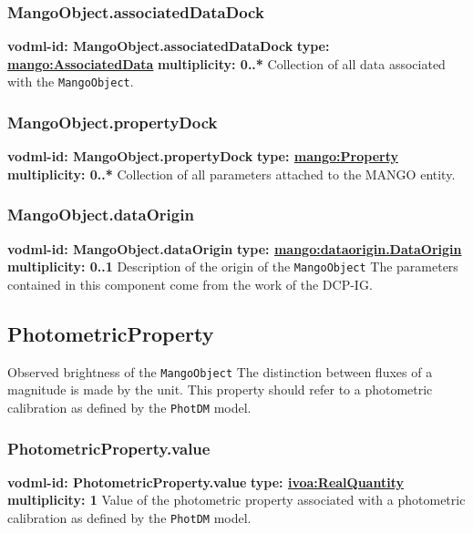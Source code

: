     \subsubsection{MangoObject.associatedDataDock}
      \textbf{vodml-id: MangoObject.associatedDataDock} \newline
      \textbf{type: \hyperref[sect:AssociatedData]{mango:AssociatedData}} \newline
      \textbf{multiplicity: 0..*} \newline 
      Collection of all data associated with the \texttt{MangoObject}.

    \subsubsection{MangoObject.propertyDock}
      \textbf{vodml-id: MangoObject.propertyDock} \newline
      \textbf{type: \hyperref[sect:Property]{mango:Property}} \newline
      \textbf{multiplicity: 0..*} \newline 
      Collection of all parameters attached to the MANGO entity.

    \subsubsection{MangoObject.dataOrigin}
      \textbf{vodml-id: MangoObject.dataOrigin} \newline
      \textbf{type: \hyperref[sect:dataorigin.DataOrigin]{mango:dataorigin.DataOrigin}} \newline
      \textbf{multiplicity: 0..1} \newline 
      Description of the origin of the \texttt{MangoObject} The parameters contained in this component come from the work of the DCP-IG.

  \subsection{PhotometricProperty}
  \label{sect:PhotometricProperty}
    Observed brightness of the \texttt{MangoObject} The distinction between fluxes of a magnitude is made by the unit. This property should refer to a photometric calibration as defined by the \texttt{PhotDM} model.

    \subsubsection{PhotometricProperty.value}
      \textbf{vodml-id: PhotometricProperty.value} \newline
      \textbf{type: \hyperref[sect:ivoa]{ivoa:RealQuantity}} \newline
      \textbf{multiplicity: 1} \newline 
      Value of the photometric property associated with a photometric calibration as defined by the \texttt{PhotDM} model.


